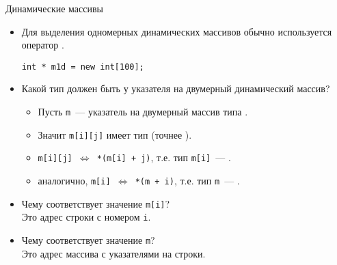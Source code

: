 \documentclass{beamer}
\begin{document}
\begin{frame}[fragile]{Динамические массивы}
    \begin{itemize}
        \item Для выделения одномерных динамических массивов
            обычно используется оператор .
\begin{lstlisting}
int * m1d = new int[100];
\end{lstlisting}
        \item Какой тип должен быть у указателя на двумерный динамический
            массив?
            \begin{itemize}
                \item Пусть {\tt m}~--- указатель на двумерный массив типа              .

                \item Значит {\tt m[i][j]} имеет тип  (точнее
                    ).

                \item {\tt m[i][j] $\Leftrightarrow$ *(m[i] + j)},
                    т.е. тип {\tt m[i]}~--- .

                \item аналогично, {\tt m[i] $\Leftrightarrow$ *(m + i)},
                    т.е. тип {\tt m}~--- .
            \end{itemize}
            \item Чему соответствует значение {\tt m[i]}?\\ 
                Это адрес строки с номером {\tt i}.

            \item Чему соответствует значение {\tt m}?\\
                Это адрес массива с указателями на строки.
    \end{itemize}
\end{frame}
\end{document}
